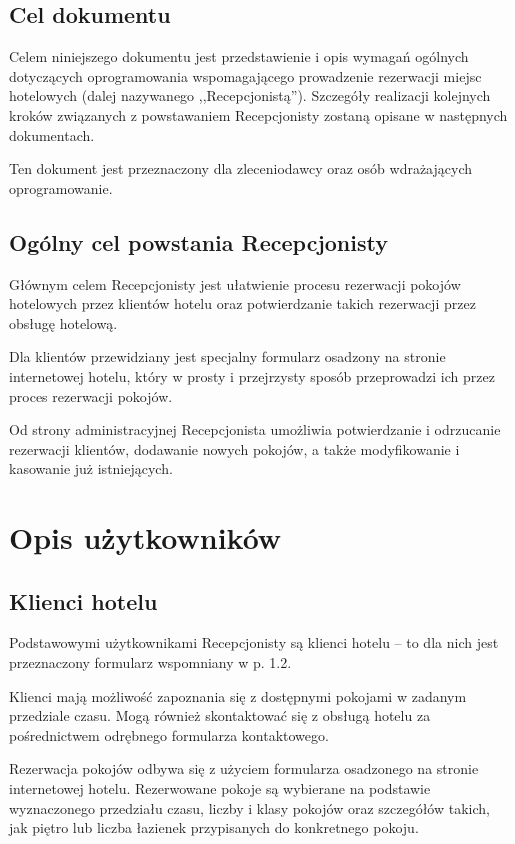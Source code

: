\documentclass [11pt, a4paper, leqno] {article}
\begin{document}
\subsection{Cel dokumentu}
\noindent
Celem niniejszego dokumentu jest przedstawienie i opis wymagań ogólnych dotyczących oprogramowania wspomagającego prowadzenie rezerwacji miejsc hotelowych (dalej nazywanego ,,Recepcjonistą''). Szczegóły realizacji kolejnych kroków związanych z powstawaniem Recepcjonisty zostaną opisane w następnych dokumentach.

Ten dokument jest przeznaczony dla zleceniodawcy oraz osób wdrażających oprogramowanie.

\subsection{Ogólny cel powstania Recepcjonisty}
\noindent
Głównym celem Recepcjonisty jest ułatwienie procesu rezerwacji pokojów hotelowych przez klientów hotelu oraz potwierdzanie takich rezerwacji przez obsługę hotelową.

Dla klientów przewidziany jest specjalny formularz osadzony na stronie internetowej hotelu, który w prosty i przejrzysty sposób przeprowadzi ich przez proces rezerwacji pokojów.

Od strony administracyjnej Recepcjonista umożliwia potwierdzanie i odrzucanie rezerwacji klientów, dodawanie nowych pokojów, a także modyfikowanie i kasowanie już istniejących.

\section{Opis użytkowników}

\subsection{Klienci hotelu}
\noindent
Podstawowymi użytkownikami Recepcjonisty są klienci hotelu -- to dla nich jest przeznaczony formularz wspomniany w p. 1.2.

Klienci mają możliwość zapoznania się z dostępnymi pokojami w zadanym przedziale czasu. Mogą również skontaktować się z obsługą hotelu za pośrednictwem odrębnego formularza kontaktowego.

Rezerwacja pokojów odbywa się z użyciem formularza osadzonego na stronie internetowej hotelu. Rezerwowane pokoje są wybierane na podstawie wyznaczonego przedziału czasu, liczby i klasy pokojów oraz szczegółów takich, jak piętro lub liczba łazienek przypisanych do konkretnego pokoju.
\end{document}
